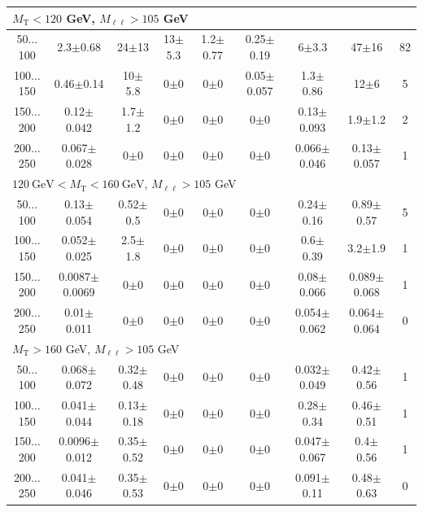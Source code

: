 \begin{landscape}
\begin{table}
\begin{center}
\begin{tabular}{| c | c c c c c c  | c  c | }
\hline\hline
\multicolumn{7}{l}{$M_{\text{T}} < 120$ GeV, $M_{\ell\ell} > 105$ GeV}\\\hline\hline
50$\dots$100&2.3$\pm$0.68&24$\pm$13&13$\pm$5.3&1.2$\pm$0.77&0.25$\pm$0.19&6$\pm$3.3&47$\pm$16&82\\
100$\dots$150&0.46$\pm$0.14&10$\pm$5.8&0$\pm$0&0$\pm$0&0.05$\pm$0.057&1.3$\pm$0.86&12$\pm$6&5\\
150$\dots$200&0.12$\pm$0.042&1.7$\pm$1.2&0$\pm$0&0$\pm$0&0$\pm$0&0.13$\pm$0.093&1.9$\pm$1.2&2\\
200$\dots$250&0.067$\pm$0.028&0$\pm$0&0$\pm$0&0$\pm$0&0$\pm$0&0.066$\pm$0.046&0.13$\pm$0.057&1\\
\hline\hline
\multicolumn{7}{l}{$120~\mathrm{GeV} < M_{\text{T}} < 160~\mathrm{GeV}$, $M_{\ell\ell} > 105$ GeV}\\\hline\hline
50$\dots$100&0.13$\pm$0.054&0.52$\pm$0.5&0$\pm$0&0$\pm$0&0$\pm$0&0.24$\pm$0.16&0.89$\pm$0.57&5\\
100$\dots$150&0.052$\pm$0.025&2.5$\pm$1.8&0$\pm$0&0$\pm$0&0$\pm$0&0.6$\pm$0.39&3.2$\pm$1.9&1\\
150$\dots$200&0.0087$\pm$0.0069&0$\pm$0&0$\pm$0&0$\pm$0&0$\pm$0&0.08$\pm$0.066&0.089$\pm$0.068&1\\
200$\dots$250&0.01$\pm$0.011&0$\pm$0&0$\pm$0&0$\pm$0&0$\pm$0&0.054$\pm$0.062&0.064$\pm$0.064&0\\
\hline\hline
\multicolumn{7}{l}{$M_{\text{T}} > 160$ GeV, $M_{\ell\ell} > 105$ GeV}\\\hline\hline
50$\dots$100&0.068$\pm$0.072&0.32$\pm$0.48&0$\pm$0&0$\pm$0&0$\pm$0&0.032$\pm$0.049&0.42$\pm$0.56&1\\
100$\dots$150&0.041$\pm$0.044&0.13$\pm$0.18&0$\pm$0&0$\pm$0&0$\pm$0&0.28$\pm$0.34&0.46$\pm$0.51&1\\
150$\dots$200&0.0096$\pm$0.012&0.35$\pm$0.52&0$\pm$0&0$\pm$0&0$\pm$0&0.047$\pm$0.067&0.4$\pm$0.56&1\\
200$\dots$250&0.041$\pm$0.046&0.35$\pm$0.53&0$\pm$0&0$\pm$0&0$\pm$0&0.091$\pm$0.11&0.48$\pm$0.63&0\\
\hline\hline
\end{tabular}
\end{center}
\end{table}
\end{landscape}